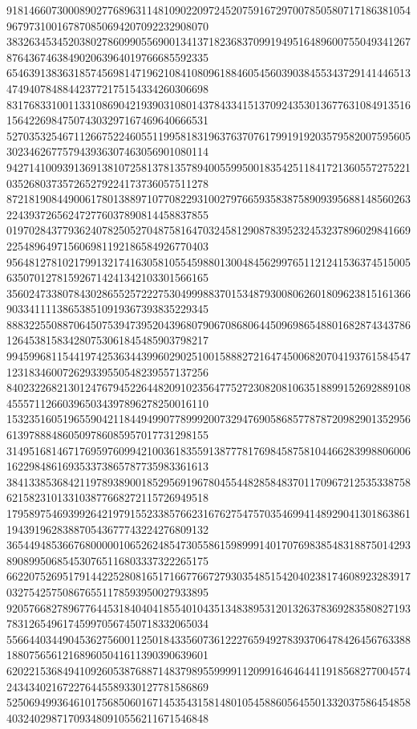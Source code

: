 \begin{DoxyCode}
      918146607300089027768963114810902209724520759167297007850580717186381054967973100167870850694207092232908070
      383263453452038027860990556900134137182368370991949516489600755049341267876436746384902063964019766685592335
      654639138363185745698147196210841080961884605456039038455343729141446513474940784884423772175154334260306698
      831768331001133108690421939031080143784334151370924353013677631084913516156422698475074303297167469640666531
      527035325467112667522460551199581831963763707617991919203579582007595605302346267757943936307463056901080114
      942714100939136913810725813781357894005599500183542511841721360557275221035268037357265279224173736057511278
      872181908449006178013889710770822931002797665935838758909395688148560263224393726562472776037890814458837855
      019702843779362407825052704875816470324581290878395232453237896029841669225489649715606981192186584926770403
      956481278102179913217416305810554598801300484562997651121241536374515005635070127815926714241342103301566165
      356024733807843028655257222753049998837015348793008062601809623815161366903341111386538510919367393835229345
      888322550887064507539473952043968079067086806445096986548801682874343786126453815834280753061845485903798217
      994599681154419742536344399602902510015888272164745006820704193761584547123183460072629339550548239557137256
      840232268213012476794522644820910235647752723082081063518899152692889108455571126603965034397896278250016110
      153235160519655904211844949907789992007329476905868577878720982901352956613978884860509786085957017731298155
      314951681467176959760994210036183559138777817698458758104466283998806006162298486169353373865787735983361613
      384133853684211978938900185295691967804554482858483701170967212535338758621582310133103877668272115726949518
      179589754693992642197915523385766231676275475703546994148929041301863861194391962838870543677743224276809132
      365449485366768000001065262485473055861598999140170769838548318875014293890899506854530765116803337322265175
      662207526951791442252808165171667766727930354851542040238174608923283917032754257508676551178593950027933895
      920576682789677644531840404185540104351348389531201326378369283580827193783126549617459970567450718332065034
      556644034490453627560011250184335607361222765949278393706478426456763388188075656121689605041611390390639601
      620221536849410926053876887148379895599991120991646464411918568277004574243434021672276445589330127781586869
      525069499364610175685060167145354315814801054588605645501332037586454858403240298717093480910556211671546848

\end{DoxyCode}
